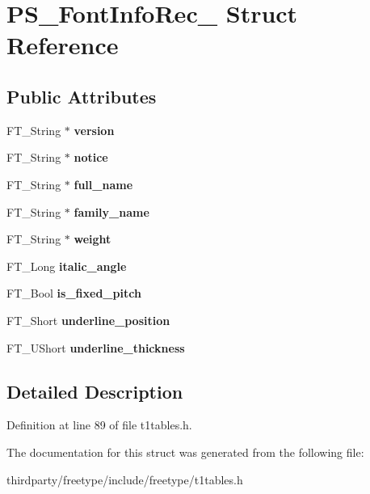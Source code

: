 \hypertarget{struct_p_s___font_info_rec__}{}\section{P\+S\+\_\+\+Font\+Info\+Rec\+\_\+ Struct Reference}
\label{struct_p_s___font_info_rec__}
\subsection*{Public Attributes}
\begin{DoxyCompactItemize}
\item 
\mbox{\label{struct_p_s___font_info_rec___adb595076e50f8e7ece9446f612433cfc}} 
F\+T\+\_\+\+String $\ast$ {\bfseries version}
\item 
\mbox{\label{struct_p_s___font_info_rec___a63858ebce653f21d9aa2ddc61ee32b80}} 
F\+T\+\_\+\+String $\ast$ {\bfseries notice}
\item 
\mbox{\label{struct_p_s___font_info_rec___a039dbf76ccc1b63b03e77215cb4b430b}} 
F\+T\+\_\+\+String $\ast$ {\bfseries full\+\_\+name}
\item 
\mbox{\label{struct_p_s___font_info_rec___ac54d883f153a495f9a20dc043ed434cf}} 
F\+T\+\_\+\+String $\ast$ {\bfseries family\+\_\+name}
\item 
\mbox{\label{struct_p_s___font_info_rec___a057243ec7cf62f573fa675ccb728f4b1}} 
F\+T\+\_\+\+String $\ast$ {\bfseries weight}
\item 
\mbox{\label{struct_p_s___font_info_rec___ab558a75a56fadd54dfc71dcbeec1375a}} 
F\+T\+\_\+\+Long {\bfseries italic\+\_\+angle}
\item 
\mbox{\label{struct_p_s___font_info_rec___a68e2d0913fe910ea86d558a4a426412a}} 
F\+T\+\_\+\+Bool {\bfseries is\+\_\+fixed\+\_\+pitch}
\item 
\mbox{\label{struct_p_s___font_info_rec___a772af52d17288d7846e8893e74d55212}} 
F\+T\+\_\+\+Short {\bfseries underline\+\_\+position}
\item 
\mbox{\label{struct_p_s___font_info_rec___a423904e811db5195485557bf0dccf126}} 
F\+T\+\_\+\+U\+Short {\bfseries underline\+\_\+thickness}
\end{DoxyCompactItemize}


\subsection{Detailed Description}


Definition at line 89 of file t1tables.\+h.



The documentation for this struct was generated from the following file\+:\begin{DoxyCompactItemize}
\item 
thirdparty/freetype/include/freetype/t1tables.\+h\end{DoxyCompactItemize}
